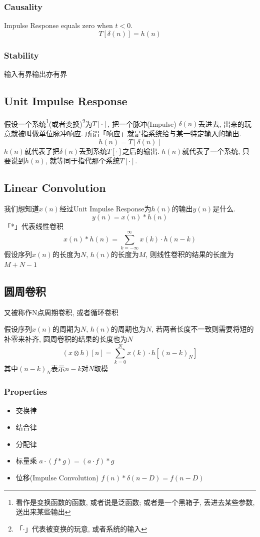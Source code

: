 \documentclass[a4paper]{report}
\begin{document}
\subsubsection{Causality}
Impulse Response equals zero when $t<0$. 
\begin{equation}
  T[\delta(n)]=h(n)
\end{equation}
\subsubsection{Stability}
输入有界输出亦有界
\subsection{Unit Impulse Response}
假设一个系统\footnote{看作是变换函数的函数, 或者说是泛函数; 或者是一个黑箱子, 丢进去某些参数, 送出来某些输出}(或者变换)\footnote{「$\cdot$」代表被变换的玩意, 或者系统的输入}为$T[\cdot]$, 把一个脉冲(Impulse) $\delta(n)$丢进去, 出来的玩意就被叫做单位脉冲响应. 所谓「响应」就是指系统给与某一特定输入的输出. 
\begin{equation}
  h(n)=T[\delta(n)]
\end{equation}
$h(n)$就代表了把$\delta(n)$丢到系统$T[\cdot]$之后的输出. $h(n)$就代表了一个系统, 只要说到$h(n)$, 就等同于指代那个系统$T[\cdot]$.
\subsection{Linear Convolution}
我们想知道$x(n)$经过Unit Impulse Response为$h(n)$的输出$y(n)$是什么. 
\begin{equation}
  y(n)=x(n) * h(n)
\end{equation}
「*」代表线性卷积
\begin{equation}
  x(n) * h(n)=\displaystyle\sum_{k=-\infty}^{\infty}x(k)\cdot h(n-k)
\end{equation}
假设序列$x(n)$的长度为$N$, $h(n)$的长度为$M$, 则线性卷积的结果的长度为$M+N-1$
\subsection{圆周卷积}
又被称作N点周期卷积, 或者循环卷积

假设序列$x(n)$的周期为$N$, $h(n)$的周期也为$N$, 若两者长度不一致则需要将短的补零来补齐, 圆周卷积的结果的长度也为$N$
\begin{equation}
  (x \otimes h)[n]=\displaystyle\sum_{k=0}^{N}x(k)\cdot h[(n-k)_N]
\end{equation}
其中$(n-k)_N$表示$n-k$对$N$取模
\subsubsection{Properties}
\begin{itemize}
  \item 交换律
  \item 结合律
  \item 分配律
  \item 标量乘 $a\cdot (f*g)=(a\cdot f)* g$
  \item 位移(Impulse Convolution) $f(n)*\delta(n-D)=f(n-D)$
\end{itemize}
\end{document}
